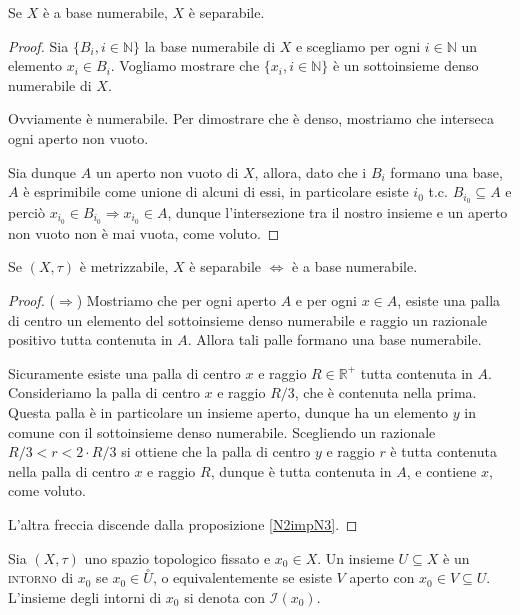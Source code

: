 \documentclass{article}
\begin{document}
\begin{prop} \label{N2impN3}
	Se $X$ è a base numerabile, $X$ è separabile.
\end{prop}

\begin{proof}
	Sia $\{ B_i, {i \in \mathbb{N}}\}$ la base numerabile di $X$ e scegliamo per
	ogni $i \in \mathbb{N}$ un elemento $x_i \in B_i$. Vogliamo mostrare che $\{
	x_i, i \in \mathbb{N} \}$ è un sottoinsieme denso numerabile di $X$.

	Ovviamente è numerabile. Per dimostrare che è denso, mostriamo che interseca
	ogni aperto non vuoto.

	Sia dunque $A$ un aperto non vuoto di $X$, allora, dato che i $B_i$ formano
	una base, $A$ è esprimibile come unione di alcuni di essi, in particolare
	esiste $i_0$ t.c. $B_{i_0} \subseteq A$ e perciò $x_{i_0} \in B_{i_0}
	\Rightarrow x_{i_0} \in A$, dunque l'intersezione tra il nostro insieme e un
	aperto non vuoto non è mai vuota, come voluto.
\end{proof}

\begin{prop} \label{metr-num}
	Se $(X, \tau)$ è metrizzabile, $X$ è separabile $\Leftrightarrow$ è a base
	numerabile.
\end{prop}

\begin{proof}
	($\Rightarrow$) Mostriamo che per ogni aperto $A$ e per ogni $x \in A$,
	esiste una palla di centro un elemento del sottoinsieme denso numerabile e
	raggio un razionale positivo tutta contenuta in $A$. Allora tali palle
	formano una base numerabile.

	Sicuramente esiste una palla di centro $x$ e raggio $R \in \mathbb{R}^+$
	tutta contenuta in $A$. Consideriamo la palla di centro $x$ e raggio $R/3$,
	che è contenuta nella prima. Questa palla è in particolare un insieme
	aperto, dunque ha un elemento $y$ in comune con il sottoinsieme denso
	numerabile. Scegliendo un razionale $R/3<r<2 \cdot R/3$ si ottiene che la
	palla di centro $y$ e raggio $r$ è tutta contenuta nella palla di centro $x$
	e raggio $R$, dunque è tutta contenuta in $A$, e contiene $x$, come voluto.

	L'altra freccia discende dalla proposizione \ref{N2impN3}.
\end{proof}

\begin{defn}
	Sia $(X, \tau)$ uno spazio topologico fissato e $x_0 \in X$. Un insieme $U
	\subseteq X$ è un \textsc{intorno} di $x_0$ se $x_0 \in
	\stackrel{\circ}{U}$, o equivalentemente se esiste $V$ aperto con $x_0 \in V
	\subseteq U$. L'insieme degli intorni di $x_0$ si denota con
	$\mathcal{I}(x_0)$.
\end{defn}
\end{document}
